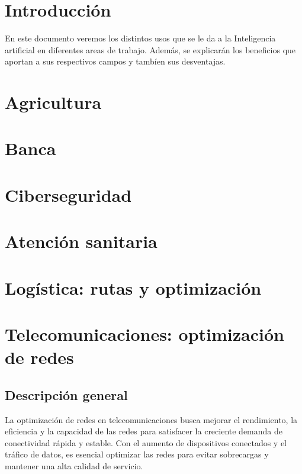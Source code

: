 \documentclass[12pt]{article}
\begin{document}
\section{Introducción}

En este documento veremos los distintos usos que se le da a la Inteligencia artificial en diferentes areas
de trabajo. Además, se explicarán los beneficios que aportan a sus respectivos campos y tambíen sus desventajas.

\section{Agricultura}
\section{Banca}
\section{Ciberseguridad}
\section{Atención sanitaria}
\section{Logística: rutas y optimización}
\section{Telecomunicaciones: optimización de redes}
\subsection{Descripción general}
La optimización de redes en telecomunicaciones busca mejorar el rendimiento, la eficiencia y la capacidad de las redes para 
satisfacer la creciente demanda de conectividad rápida y estable. Con el aumento de dispositivos conectados y el tráfico de datos, 
es esencial optimizar las redes para evitar sobrecargas y mantener una alta calidad de servicio.
\end{document}
